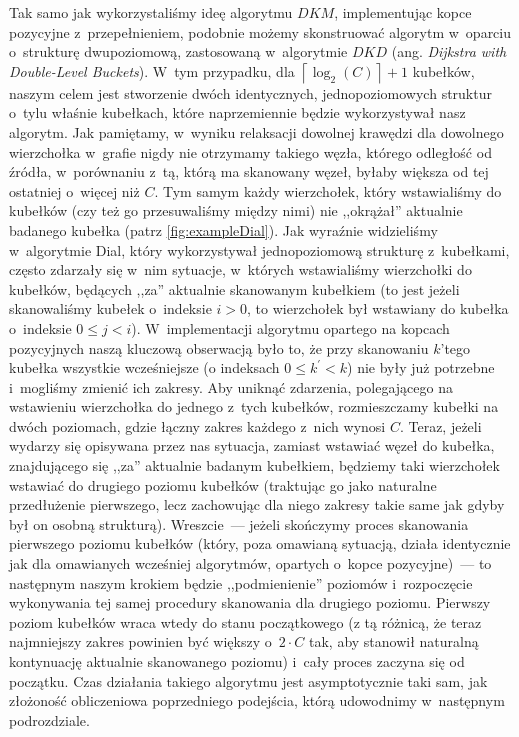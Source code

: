Tak samo jak wykorzystaliśmy ideę algorytmu $DKM$, implementując kopce pozycyjne z~przepełnieniem, podobnie możemy skonstruować algorytm w~oparciu o~strukturę dwupoziomową, zastosowaną w~algorytmie $DKD$ (ang. \textit{Dijkstra with Double-Level Buckets}). W~tym przypadku, dla $ \left \lceil \log_{2} \left( C \right) \right \rceil + 1$ kubełków, naszym celem jest stworzenie dwóch identycznych, jednopoziomowych struktur o~tylu właśnie kubełkach, które naprzemiennie będzie wykorzystywał nasz algorytm. Jak pamiętamy, w~wyniku relaksacji dowolnej krawędzi dla dowolnego wierzchołka w~grafie nigdy nie otrzymamy takiego węzła, którego odległość od źródła, w~porównaniu z~tą, którą ma skanowany węzeł, byłaby większa od tej ostatniej o~więcej niż $C$. Tym samym każdy wierzchołek, który wstawialiśmy do kubełków (czy też go przesuwaliśmy między nimi) nie ,,okrążał'' aktualnie badanego kubełka (patrz \ref{fig:exampleDial}). Jak wyraźnie widzieliśmy w~algorytmie Dial, który wykorzystywał jednopoziomową strukturę z~kubełkami, często zdarzały się w~nim sytuacje, w~których wstawialiśmy wierzchołki do kubełków, będących ,,za'' aktualnie skanowanym kubełkiem (to jest jeżeli skanowaliśmy kubełek o~indeksie $i > 0$, to wierzchołek był wstawiany do kubełka o~indeksie $0 \leqslant j < i$). W~implementacji algorytmu opartego na kopcach pozycyjnych naszą kluczową obserwacją było to, że przy skanowaniu $k$'tego kubełka wszystkie wcześniejsze (o indeksach $0 \leqslant k^{'} < k$) nie były już potrzebne i~mogliśmy zmienić ich zakresy. Aby uniknąć zdarzenia, polegającego na wstawieniu wierzchołka do jednego z~tych kubełków, rozmieszczamy kubełki na dwóch poziomach, gdzie łączny zakres każdego z~nich wynosi $C$. Teraz, jeżeli wydarzy się opisywana przez nas sytuacja, zamiast wstawiać węzeł do kubełka, znajdującego się ,,za'' aktualnie badanym kubełkiem, będziemy taki wierzchołek wstawiać do drugiego poziomu kubełków (traktując go jako naturalne przedłużenie pierwszego, lecz zachowując dla niego zakresy takie same jak gdyby był on osobną strukturą). Wreszcie~--- jeżeli skończymy proces skanowania pierwszego poziomu kubełków (który, poza omawianą sytuacją, działa identycznie jak dla omawianych wcześniej algorytmów, opartych o~kopce pozycyjne)~--- to następnym naszym krokiem będzie ,,podmienienie'' poziomów i~rozpoczęcie wykonywania tej samej procedury skanowania dla drugiego poziomu. Pierwszy poziom kubełków wraca wtedy do stanu początkowego (z tą różnicą, że teraz najmniejszy zakres powinien być większy o~$2 \cdot C$ tak, aby stanowił naturalną kontynuację aktualnie skanowanego poziomu) i~cały proces zaczyna się od początku. Czas działania takiego algorytmu jest asymptotycznie taki sam, jak złożoność obliczeniowa poprzedniego podejścia, którą udowodnimy w~następnym podrozdziale.

